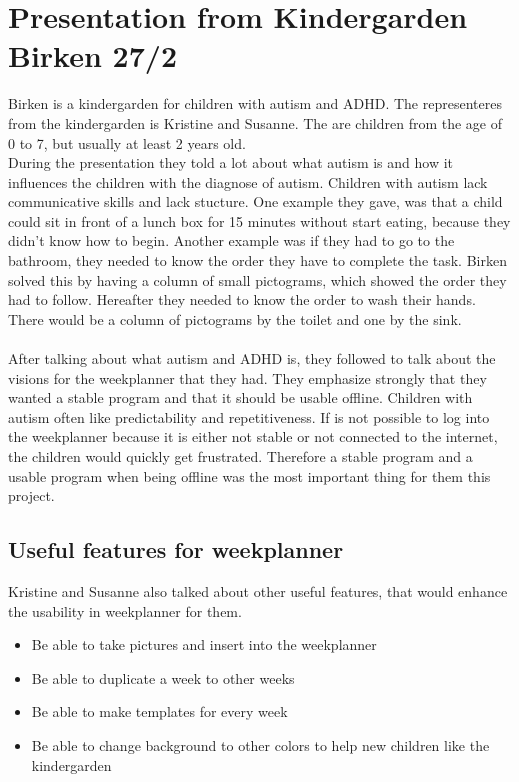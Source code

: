 \section{Presentation from Kindergarden Birken 27/2}
Birken is a kindergarden for children with autism and ADHD.
The representeres from the kindergarden is Kristine and Susanne.
The are children from the age of 0 to 7, but usually at least 2 years old.
\\
During the presentation they told a lot about what autism is and how it influences the children with the diagnose of autism.
Children with autism lack communicative skills and lack stucture. 
One example they gave, was that a child could sit in front of a lunch box for 15 minutes without start eating, because they didn't know how to begin.
Another example was if they had to go to the bathroom, they needed to know the order they have to complete the task.
Birken solved this by having a column of small pictograms, which showed the order they had to follow. 
Hereafter they needed to know the order to wash their hands.
There would be a column of pictograms by the toilet and one by the sink.
\\\\
After talking about what autism and ADHD is, they followed to talk about the visions for the weekplanner that they had.
They emphasize strongly that they wanted a stable program and that it should be usable offline.
Children with autism often like predictability and repetitiveness. 
If is not possible to log into the weekplanner because it is either not stable or not connected to the internet, the children would quickly get frustrated.
Therefore a stable program and a usable program when being offline was the most important thing for them this project.

\subsection{Useful features for weekplanner}
Kristine and Susanne also talked about other useful features, that would enhance the usability in weekplanner for them.

\begin{itemize}
    \item Be able to take pictures and insert into the weekplanner
    \item Be able to duplicate a week to other weeks
    \item Be able to make templates for every week
    \item Be able to change background to other colors to help new children like the kindergarden 
\end{itemize}

